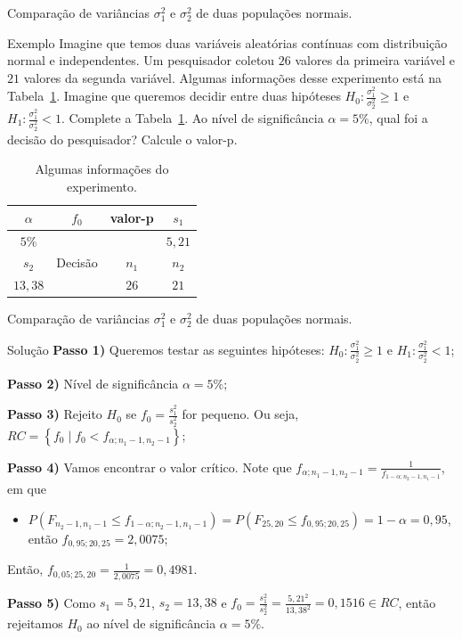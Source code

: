 \documentclass[9pt]{beamer}
\begin{document}
\begin{frame}{Comparação de variâncias $\sigma_1^2$ e $\sigma_2^2$ de duas populações normais.}

\begin{block}{Exemplo}
	Imagine que temos duas variáveis aleatórias contínuas com distribuição normal e independentes. Um pesquisador coletou $26$ valores da primeira variável e $21$ valores da segunda variável. Algumas informações desse experimento está na Tabela~\ref{tab:test-variance-h1-lower}. Imagine que queremos decidir entre duas hipóteses $H_0: \frac{\sigma_1^2}{\sigma_2^2} \geq 1$ e $H_1: \frac{\sigma_1^2}{\sigma_2^2} < 1$. Complete a Tabela~\ref{tab:test-variance-h1-lower}. Ao nível de significância $\alpha=5\%$, qual foi a decisão do pesquisador? Calcule o valor-p.
	\begin{table}[htbp]
		\centering
		\begin{tabular}{c|c|c|c}
			\toprule[0.05cm]
			$\alpha$ & $f_0$ & valor-p & $s_1$\\
			\midrule[0.025cm]
			$5\%$ & & & $5,21$ \\
			\midrule[0.05cm]
			$s_2$ & Decisão & $n_1$ & $n_2$\\ \midrule[0.025cm]
			$13,38$ & & $26$ & $21$\\
			\bottomrule[0.05cm]
		\end{tabular}
		\caption{Algumas informações do experimento.}
		\label{tab:test-variance-h1-lower}
	\end{table}
\end{block}
\end{frame}

\begin{frame}{Comparação de variâncias $\sigma_1^2$ e $\sigma_2^2$ de duas populações normais.}

\begin{block}{Solução}
	\textbf{Passo 1)} Queremos testar as seguintes hipóteses: $H_0: \frac{\sigma_1^2}{\sigma_2^2} \geq 1$ e $H_1: \frac{\sigma_1^2}{\sigma_2^2} < 1$;
	
	\textbf{Passo 2)} Nível de significância $\alpha=5\%$;
	
	\textbf{Passo 3)} Rejeito $H_0$ se $f_0 = \frac{s_1^2}{s_2^2}$ for pequeno. Ou seja, $RC=\left\{ f_0 \mid f_0 < f_{\alpha; n_1-1, n_2-1} \right\}$;
	
	\textbf{Passo 4)} Vamos encontrar o valor crítico. Note que $f_{\alpha; n_1-1, n_2-1} = \frac{1}{f_{1-\alpha; n_2-1, n_1-1}}$, em que
	\begin{itemize}
		\item $P\left(F_{n_2-1, n_1-1} \leq f_{1-\alpha;n_2-1, n_1-1} \right) = P\left(F_{25, 20} \leq f_{0,95;20, 25} \right) = 1-\alpha=0,95$, então $f_{0,95;20, 25} = 2,0075$;
	\end{itemize}
	Então, $f_{0,05; 25, 20} = \frac{1}{2,0075} = 0,4981$.
	
	\textbf{Passo 5)} Como $s_1 = 5,21$, $s_2 = 13,38$ e $f_0 = \frac{s_1^2}{s_2^2} = \frac{5,21^2}{13,38^2} = 0,1516 \in RC$, então rejeitamos $H_0$ ao nível de significância $\alpha=5\%$.
	
\end{block}
\end{frame}
\end{document}
